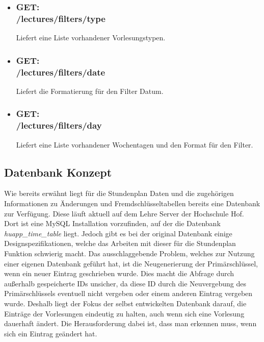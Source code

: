 \begin{itemize}
\item \subsubsection{GET:\\ /lectures/filters/type} 
Liefert eine Liste vorhandener Vorlesungstypen.
\item \subsubsection{GET:\\ /lectures/filters/date} 
Liefert die Formatierung für den Filter Datum.
\item \subsubsection{GET:\\ /lectures/filters/day} 
Liefert eine Liste vorhandener Wochentagen und den Format für den Filter.
\end{itemize}

\subsection*{Datenbank Konzept}
\label{sec:stundenplan_db}

Wie bereits erwähnt liegt für die Stundenplan Daten und die zugehörigen Informationen zu Änderungen und Fremdschlüsseltabellen bereits eine Datenbank zur Verfügung. Diese läuft aktuell auf dem Lehre Server der Hochschule Hof. 
\\
\linebreak
Dort ist eine MySQL Installation vorzufinden, auf der die Datenbank \textit{huapp_time_\-table} liegt. Jedoch gibt es bei der original Datenbank einige Designspezifikationen, welche das Arbeiten mit dieser für die Stundenplan Funktion schwierig macht. Das ausschlaggebende Problem, welches zur Nutzung einer eigenen Datenbank geführt hat, ist die Neugenerierung der Primärschlüssel, wenn ein neuer Eintrag geschrieben wurde. Dies macht die Abfrage durch außerhalb gespeicherte IDs unsicher, da diese ID durch die Neuvergebung des Primärschlüssels eventuell nicht vergeben oder einem anderen Eintrag vergeben wurde. Deshalb liegt der Fokus der selbst entwickelten Datenbank darauf, die Einträge der Vorlesungen eindeutig zu halten, auch wenn sich eine Vorlesung dauerhaft ändert. Die Herausforderung dabei ist, dass man erkennen muss, wenn sich ein Eintrag geändert hat. 

